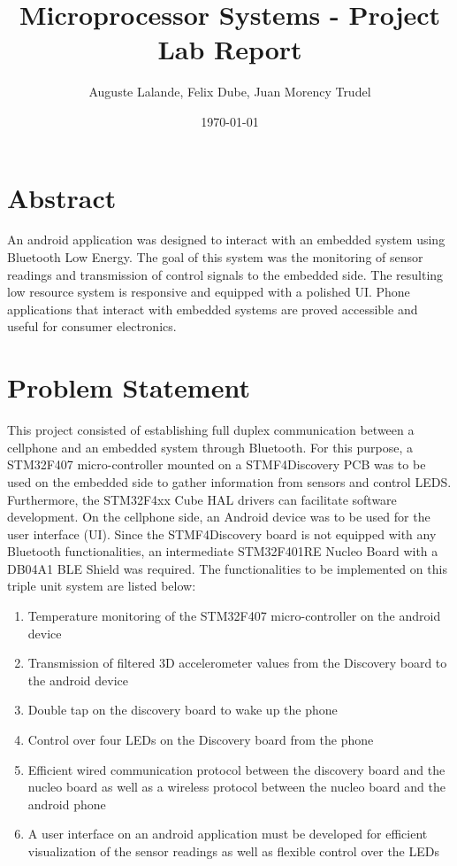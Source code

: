 \documentclass[12pt]{article}
\title{Microprocessor Systems - Project Lab Report}
\author{Auguste Lalande, Felix Dube, Juan Morency Trudel}
\date{\today}
\begin{document}
\maketitle
\clearpage

\tableofcontents
\clearpage

\section{Abstract}
An android application was designed to interact with an embedded system using Bluetooth Low Energy. The goal of this system was the monitoring of sensor readings and transmission of control signals to the embedded side. The resulting low resource system is responsive and equipped with a polished UI. Phone applications that interact with embedded systems are proved accessible and useful for consumer electronics.
\section{Problem Statement}
This project consisted of establishing full duplex communication between a cellphone and an embedded system through Bluetooth. For this purpose, a STM32F407 micro-controller mounted on a STMF4Discovery PCB was to be used on the embedded side to gather information from sensors and control LEDS. Furthermore,  the STM32F4xx Cube HAL drivers can facilitate software development. On the cellphone side, an Android device was to be used for the user interface (UI). Since the STMF4Discovery board is not equipped with any Bluetooth functionalities, an intermediate STM32F401RE Nucleo Board with a DB04A1 BLE Shield was required. The functionalities to be implemented on this triple unit system are listed below:

\begin{enumerate}
\item Temperature monitoring of the STM32F407 micro-controller on the android device
\item Transmission of filtered 3D accelerometer values from the Discovery board to the android device
\item Double tap on the discovery board to wake up the phone
\item Control over four LEDs on the Discovery board from the phone
\item Efficient wired communication protocol between the discovery board and the nucleo board as well as a wireless protocol between the nucleo board and the android phone 
\item A user interface on an android application must be developed for efficient visualization of the sensor readings as well as flexible control over the LEDs 
\end{enumerate}
\end{document}
